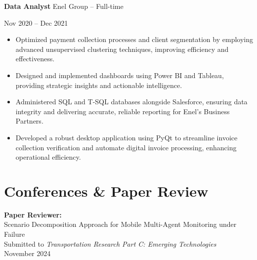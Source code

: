 \documentclass[10pt, letterpaper]{article}
\newenvironment{highlights}{
    \begin{itemize}[
        topsep=0.10 cm,
        parsep=0.10 cm,
        partopsep=0pt,
        itemsep=0pt,
        leftmargin=0 cm + 10pt
    ]
}{
    \end{itemize}
} %
\newenvironment{twocolentry}[2][]{
    \onecolentry
    \def\secondColumn{#2}
    \setcolumnwidth{\fill, 4.5 cm}
    \begin{paracol}{2}
}{
    \switchcolumn \raggedleft \secondColumn
    \end{paracol}
    \endonecolentry
} %
\begin{document}
\begin{twocolentry}{Nov 2020 – Dec 2021}
    \textbf{Data Analyst} \textbar Enel Group – Full-time
\end{twocolentry}
\begin{highlights}
    \item Optimized payment collection processes and client segmentation by employing advanced unsupervised clustering techniques, improving efficiency and effectiveness.
    \item Designed and implemented dashboards using Power BI and Tableau, providing strategic insights and actionable intelligence.
    \item Administered SQL and T-SQL databases alongside Salesforce, ensuring data integrity and delivering accurate, reliable reporting for Enel's Business Partners.
    \item Developed a robust desktop application using PyQt to streamline invoice collection verification and automate digital invoice processing, enhancing operational efficiency.
\end{highlights}

\vspace{0.3cm}












\section*{Conferences \& Paper Review}
\textbf{Paper Reviewer:}\\
Scenario Decomposition Approach for Mobile Multi-Agent Monitoring under Failure\\
Submitted to \textit{Transportation Research Part C: Emerging Technologies } \\
November 2024\\
\end{document}
